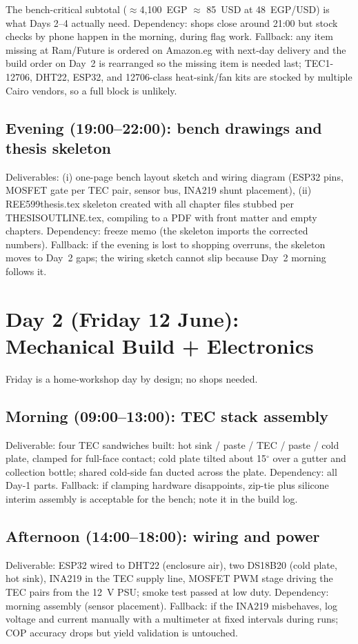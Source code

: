 \documentclass[11pt,a4paper]{article}
\newcommand{\f}[1]{{\ttfamily\def\_{\textunderscore\allowbreak}#1}}
\begin{document}
The bench-critical subtotal ($\approx$4{,}100~EGP $\approx$ 85~USD at
48~EGP/USD) is what Days 2--4 actually need. Dependency: shops close around
21:00 but stock checks by phone happen in the morning, during flag work.
Fallback: any item missing at Ram/Future is ordered on Amazon.eg with next-day
delivery and the build order on Day~2 is rearranged so the missing item is
needed last; TEC1-12706, DHT22, ESP32, and 12706-class heat-sink/fan kits are
stocked by multiple Cairo vendors, so a full block is unlikely.

\subsection*{Evening (19:00--22:00): bench drawings and thesis skeleton}
Deliverables: (i) one-page bench layout sketch and wiring diagram
(ESP32 pins, MOSFET gate per TEC pair, sensor bus, INA219 shunt placement),
(ii) \f{REE599\_thesis.tex} skeleton created with all chapter files stubbed
per \f{THESIS\_OUTLINE.tex}, compiling to a PDF with front matter and empty
chapters. Dependency: freeze memo (the skeleton imports the corrected
numbers). Fallback: if the evening is lost to shopping overruns, the skeleton
moves to Day~2 gaps; the wiring sketch cannot slip because Day~2 morning
follows it.

\section{Day 2 (Friday 12 June): Mechanical Build + Electronics}
Friday is a home-workshop day by design; no shops needed.

\subsection*{Morning (09:00--13:00): TEC stack assembly}
Deliverable: four TEC sandwiches built: hot sink / paste / TEC / paste / cold
plate, clamped for full-face contact; cold plate tilted about 15$^{\circ}$
over a gutter and collection bottle; shared cold-side fan ducted across the
plate. Dependency: all Day-1 parts. Fallback: if clamping hardware
disappoints, zip-tie plus silicone interim assembly is acceptable for the
bench; note it in the build log.

\subsection*{Afternoon (14:00--18:00): wiring and power}
Deliverable: ESP32 wired to DHT22 (enclosure air), two DS18B20 (cold plate,
hot sink), INA219 in the TEC supply line, MOSFET PWM stage driving the TEC
pairs from the 12~V PSU; smoke test passed at low duty. Dependency: morning
assembly (sensor placement). Fallback: if the INA219 misbehaves, log voltage
and current manually with a multimeter at fixed intervals during runs; COP
accuracy drops but yield validation is untouched.
\end{document}
